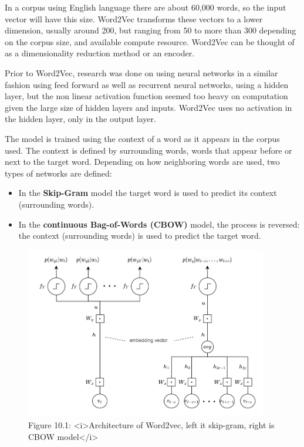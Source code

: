 In a corpus using English language there are about 60,000 words, so the input vector will have this size. Word2Vec transforms these vectors to a lower dimension, usually around 200, but ranging from 50 to more than 300 depending on the corpus size, and available compute resource. Word2Vec can be thought of as a dimensionality reduction method or an encoder.

Prior to Word2Vec, research was done on using neural networks in a similar fashion using feed forward as well as recurrent neural networks, using a hidden layer, but the non linear activation function seemed too heavy on computation given the large size of hidden layers and inputs. Word2Vec uses no activation in the hidden layer, only in the output layer.

The model is trained using the context of a word as it appears in the corpus used. The context is defined by surrounding words, words that appear before or next to the target word. Depending on how neighboring words are used, two types of networks are defined:

\begin{itemize}
    \item In the \textbf{Skip-Gram} model the target word is used to predict its context (surrounding words).
    \item In the \textbf{continuous Bag-of-Words (CBOW)} model, the process is reversed: the context (surrounding words) is used to predict the target word.
\end{itemize}


\begin{figure}[htbp]
    \begin{center}
        \includegraphics[width=300pt]{../img/10-word2vec.png}
        \caption{Figure 10.1: <i>Architecture of Word2vec, left it skip-gram, right is CBOW model</i>}
    \end{center}
\end{figure}


